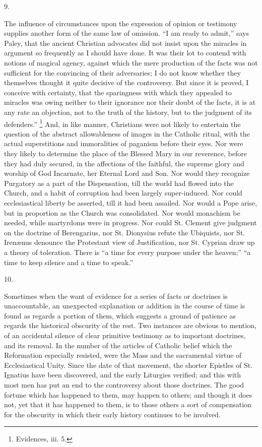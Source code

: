 9.

The influence of circumstances upon the expression of
opinion or testimony supplies another form of the same
law of omission. ``I am ready to admit,'' says
Paley, that the ancient Christian advocates did not
insist upon the miracles in argument so frequently as I
should have done. It was their lot to contend with
notions of magical agency, against which the mere
production of the facts was not sufficient for the
convincing of their adversaries; I do not know whether
they themselves thought it quite decisive of the
controversy. But since it is proved, I conceive with
certainty, that the sparingness with which they appealed
to miracles was owing neither to their ignorance nor
their doubt of the facts, it is at any rate an objection,
not to the truth of the history, but to the judgment of
its defenders.'' \footnote{Evidences, iii. 5.} And, in like manner,
Christians were not likely to entertain the question of
the abstract allowableness of images in the Catholic
ritual, with the actual superstitions and immoralities of
paganism before their eyes. Nor were they likely to
determine the place of the Blessed Mary in our reverence,
before they had duly secured, in the affections of the
faithful, the supreme glory and worship of God Incarnate,
her Eternal Lord and Son. Nor would they recognize
Purgatory as a part of the Dispensation, till the world
had flowed into the Church, and a habit of corruption had
been largely super-induced. Nor could ecclesiastical
liberty be asserted, till it had been assailed. Nor would
a Pope arise, but in proportion as the Church was
consolidated. Nor would monachism be needed, while
martyrdoms were in progress. Nor could St. Clement give
judgment on the doctrine of Berengarius, nor St.
Dionysius refute the Ubiquists, nor St. Irenænus
denounce the Protestant view of Justification, nor St.
Cyprian draw up a theory of toleration. There is ``a
time for every purpose under the heaven;'' ``a
time to keep silence and a time to speak.''

10.

Sometimes when the want of evidence for a series of
facts or doctrines is unaccountable, an unexpected
explanation or addition in the course of time is found as
regards a portion of them, which suggests a ground of
patience as regards the historical obscurity of the rest.
Two instances are obvious to mention, of an accidental
silence of clear primitive testimony as to important
doctrines, and its removal. In the number of the articles
of Catholic belief which the Reformation especially
resisted, were the Mass and the sacramental virtue of
Ecclesiastical Unity. Since the date of that movement,
the shorter Epistles of St. Ignatius have been
discovered, and the early Liturgies verified; and this
with most men has put an end to the controversy about
those doctrines. The good fortune which has happened to
them, may happen to others; and though it does not, yet
that it has happened to them, is to those others a sort
of compensation for the obscurity in which their early
history continues to be involved.

